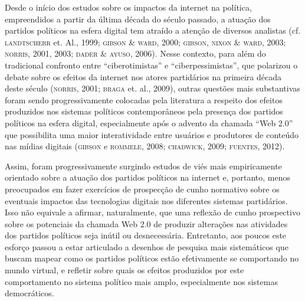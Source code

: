 Desde o início dos estudos sobre os impactos da internet na política,
empreendidos a partir da última década do século passado, a atuação dos
partidos políticos na esfera digital tem atraído a atenção de diversos
analistas (cf. \textsc{landtscherr} et. Al., 1999; \textsc{gibson} \& \textsc{ward}, 2000; \textsc{gibson},
\textsc{nixon} \& \textsc{ward}, 2003; \textsc{norris}, 2001, 2003; \textsc{dader} \& \textsc{ayuso}, 2006). Nesse
contexto, para além do tradicional confronto entre ``ciberotimistas'' e
``ciberpessimistas'', que polarizou o debate sobre os efeitos da
internet nos atores partidários na primeira década deste século (\textsc{norris},
2001; \textsc{braga} et. al., 2009), outras questões mais substantivas foram
sendo progressivamente colocadas pela literatura a respeito dos efeitos
produzidos nos sistemas políticos contemporâneos pela presença dos
partidos políticos na esfera digital, especialmente após o advento da
chamada ``Web 2.0'' que possibilita uma maior interatividade entre
usuários e produtores de conteúdo nas mídias digitais (\textsc{gibson} e \textsc{rommele},
2008; \textsc{chadwick}, 2009; \textsc{fuentes}, 2012).

Assim, foram progressivamente surgindo estudos de viés mais
empiricamente orientado sobre a atuação dos partidos políticos na
internet e, portanto, menos preocupados em fazer exercícios de
prospecção de cunho normativo sobre os eventuais impactos das
tecnologias digitais nos diferentes sistemas partidários. Isso não
equivale a afirmar, naturalmente, que uma reflexão de cunho prospectivo
sobre os potenciais da chamada Web 2.0 de produzir alterações nas
atividades dos partidos políticos seja inútil ou desnecessária.
Entretanto, aos poucos este esforço passou a estar articulado a desenhos
de pesquisa mais sistemáticos que buscam mapear como os partidos
políticos estão efetivamente se comportando no mundo virtual, e refletir
sobre quais os efeitos produzidos por este comportamento no sistema
político mais amplo, especialmente nos sistemas democráticos.

